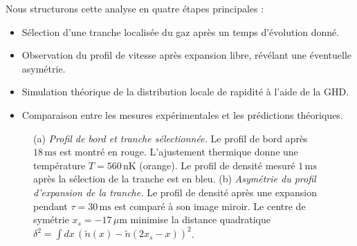 \medskip

Nous structurons cette analyse en quatre étapes principales :
\begin{itemize}
    \item Sélection d’une tranche localisée du gaz après un temps d’évolution donné.
    \item Observation du profil de vitesse après expansion libre, révélant une éventuelle asymétrie.
    \item Simulation théorique de la distribution locale de rapidité à l’aide de la GHD.
    \item Comparaison entre les mesures expérimentales et les prédictions théoriques.
\end{itemize}


\begin{figure}[!htb]
\centering
{}
\caption{(a) {\it Profil de bord et tranche sélectionnée.} Le profil de bord après $18\,\mathrm{ms}$ est montré en rouge. L'ajustement thermique donne une température $T = 560\,\mathrm{nK}$ (orange). Le profil de densité mesuré $1\,\mathrm{ms}$ après la sélection de la tranche est en bleu. (b) {\it Asymétrie du profil d’expansion de la tranche.} Le profil de densité après une expansion pendant $\tau = 30\,\mathrm{ms}$ est comparé à son image miroir. Le centre de symétrie $x_s = -17\,\mu$m minimise la distance quadratique $\delta^2 = \int dx\, (\tilde{n}(x) - \tilde{n}(2x_s - x))^2$.}
\label{fig:simul_deformation}
\end{figure}



